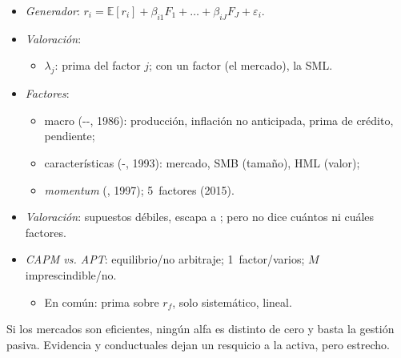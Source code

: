 \documentclass{article}
\begin{document}
\begin{columnas}
\begin{itemize}
\item \emph{Generador}: $r_i=\mathbb{E}[r_i]+\beta_{i1}F_1+\dots+\beta_{iJ}F_J+\varepsilon_i$.
\item \emph{Valoración}:
  \begin{itemize}
  \item $\lambda_j$: prima del factor $j$; con un factor (el mercado), la SML.
  \end{itemize}
\item \emph{Factores}:
  \begin{itemize}
  \item macro (--, 1986): producción, inflación no anticipada, prima de crédito, pendiente;
  \item características (-, 1993): mercado, SMB (tamaño), HML (valor);
  \item \emph{momentum} (, 1997); 5~factores (2015).
  \end{itemize}
\item \emph{Valoración}: supuestos débiles, escapa a ; pero no dice cuántos ni cuáles factores.
\item \emph{CAPM vs. APT}: equilibrio/no arbitraje; 1~factor/varios; $M$ imprescindible/no.
  \begin{itemize}
  \item En común: prima sobre $r_f$, solo sistemático, lineal.
  \end{itemize}
\end{itemize}

\begin{ideaclave}
Si los mercados son eficientes, ningún alfa es distinto de cero y basta la gestión pasiva. Evidencia y conductuales dejan un resquicio a la activa, pero estrecho.
\end{ideaclave}


\end{columnas}
\end{document}
